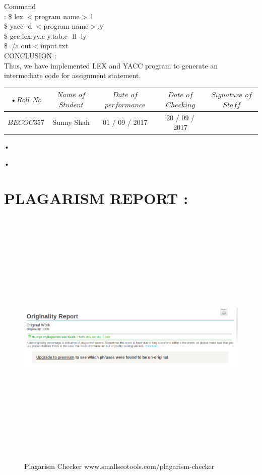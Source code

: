 \documentclass[11pt]{article}
\begin{document}
	\noindent
	Command\\ :
	\$ lex $<$program name$>$.l\\
	\$ yacc -d $<$program name$>$.y\\
	\$ gcc lex.yy.c y.tab.c -ll -ly\\
	\$ ./a.out$<$input.txt\\
	
	\noindent
	CONCLUSION :\\
	Thus, we have implemented LEX and YACC program to generate an intermediate code for assignment statement.\\
	
	\begin{center}
		\begin{tabular}{|c|c|c|c|c|}
			•$Roll$ $No$ & $Name$ $of$ $Student$ & $Date$ $of$ $performance$ & $Date$ $of$ $Checking$ & $Signature$ $of$ $Staff$ \\ \hline
			$BECOC357$ & Sunny Shah& 01 / 09 / 2017& 20 / 09 / 2017 & \\ \hline
		\end{tabular}•
	\end{center}•
	\newpage
	\section{PLAGARISM REPORT :}
	\begin{figure}[h!]
		\centering
		\includegraphics[height=5in,width=6in]{plagiarism4.png}
		\caption{Plagarism Checker www.smallseotools.com/plagarism-checker}
	\end{figure}
	\newpage
\end{document}
